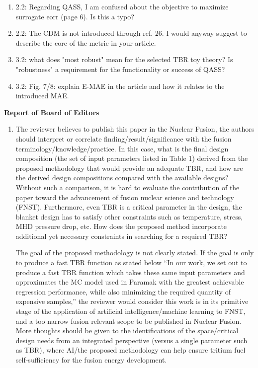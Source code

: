 \documentclass[12pt]{article}
\begin{document}
\begin{enumerate}
{\bf }

\item 2.2: Regarding QASS, I am confused about the objective to maximize surrogate eorr (page 6). Is this a typo?

{\bf }

\item 2.2: The CDM is not introduced through ref. 26. I would anyway suggest to describe the core of the metric in your article.

{\bf }

\item 3.2: what does "most robust" mean for the selected TBR toy theory? Is "robustness" a requirement for the functionality or success of QASS?

{\bf }

\item 3.2: Fig. 7/8: explain E-MAE in the article and how it relates to the introduced MAE.

{\bf }

\end{enumerate}

\bigskip
\noindent
{\bf Report of Board of Editors}

\begin{enumerate}
\item The reviewer believes to publish this paper in the Nuclear Fusion, the authors should interpret or correlate finding/result/significance with the fusion terminology/knowledge/practice. In this case, what is the final design composition (the set of input parameters listed in Table 1) derived from the proposed methodology that would provide an adequate TBR, and how are the derived design compositions compared with the available designs? Without such a comparison, it is hard to evaluate the contribution of the paper toward the advancement of fusion nuclear science and technology (FNST). Furthermore, even TBR is a critical parameter in the design, the blanket design has to satisfy other constraints such as temperature, stress, MHD pressure drop, etc. How does the proposed method incorporate additional yet necessary constraints in searching for a required TBR?

The goal of the proposed methodology is not clearly stated. If the goal is only to produce a fast TBR function as stated below “In our work, we set out to produce a fast TBR function which takes these same input parameters and approximates the MC model used in Paramak with the greatest achievable regression performance, while also minimizing the required quantity of expensive samples,” the reviewer would consider this work is in its primitive stage of the application of artificial intelligence/machine learning to FNST, and a too narrow fusion relevant scope to be published in Nuclear Fusion. More thoughts should be given to the identifications of the space/critical design needs from an integrated perspective (versus a single parameter such as TBR), where AI/the proposed methodology can help ensure tritium fuel self-sufficiency for the fusion energy development.

{\bf }

\end{enumerate}
\end{document}
